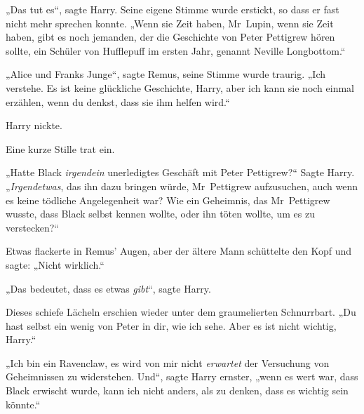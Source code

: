 „Das tut es“, sagte Harry. Seine eigene Stimme wurde erstickt, so dass er fast nicht mehr sprechen konnte.
„Wenn sie Zeit haben, Mr~Lupin, wenn sie Zeit haben, gibt es noch jemanden, der die Geschichte von Peter Pettigrew hören sollte, ein Schüler von Hufflepuff im ersten Jahr, genannt Neville Longbottom.“

„Alice und Franks Junge“, sagte Remus, seine Stimme wurde traurig.
„Ich verstehe. Es ist keine glückliche Geschichte, Harry, aber ich kann sie noch einmal erzählen, wenn du denkst, dass sie ihm helfen wird.“

Harry nickte.

Eine kurze Stille trat ein.

„Hatte Black \emph{irgendein} unerledigtes Geschäft mit Peter Pettigrew?“ Sagte Harry.
„\emph{Irgendetwas}, das ihn dazu bringen würde, Mr~Pettigrew aufzusuchen, auch wenn es keine tödliche Angelegenheit war? Wie ein Geheimnis, das Mr~Pettigrew wusste, dass Black selbst kennen wollte, oder ihn töten wollte, um es zu verstecken?“

Etwas flackerte in Remus’ Augen, aber der ältere Mann schüttelte den Kopf und sagte:
„Nicht wirklich.“

„Das bedeutet, dass es etwas \emph{gibt}“, sagte Harry.

Dieses schiefe Lächeln erschien wieder unter dem graumelierten Schnurrbart.
„Du hast selbst ein wenig von Peter in dir, wie ich sehe. Aber es ist nicht wichtig, Harry.“

„Ich bin ein Ravenclaw, es wird von mir nicht \emph{erwartet} der Versuchung von Geheimnissen zu widerstehen. Und“, sagte Harry ernster, „wenn es wert war, dass Black erwischt wurde, kann ich nicht anders, als zu denken, dass es wichtig sein könnte.“

